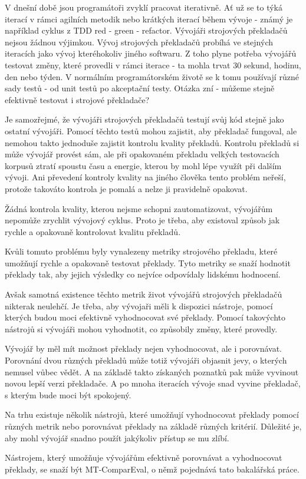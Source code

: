 V dnešní době jsou programátoři zvyklí pracovat iterativně.
Ať už se to týká iterací v rámci agilních metodik
  nebo krátkých iterací během vývoje - známý je například cyklus z TDD red - green - refactor.
Vývojáři strojových překladačů nejsou žádnou výjimkou.
Vývoj strojových překladačů probíhá ve stejných iteracích jako vývoj kteréhokoliv jiného softwaru.
Z toho plyne potřeba vývojářů testovat změny,
  které provedli v rámci iterace
  - ta mohla trvat 30 sekund, hodinu, den nebo týden.
V normálním programátorském životě se k tomu používají různé sady testů - od unit testů po akceptační testy.
Otázka zní - můžeme stejně efektivně testovat i strojové překladače?

Je samozřejmé, 
  že vývojáři strojových překladačů testují svůj kód stejně jako ostatní vývojáři.
Pomocí těchto testů mohou zajistit,
  aby překladač fungoval,
  ale nemohou takto jednoduše zajistit kontrolu kvality překladů.
Kontrolu překladů si může vývojář provést sám,
  ale při opakovaném překladu velkých testovacích korpusů ztratí spoustu času a energie,
  kterou by mohl lépe využít při dalším vývoji.
Ani převedení kontroly kvality na jiného člověka tento problém neřeší,
  protože takováto kontrola je pomalá a nelze ji pravidelně opakovat.

Žádná kontrola kvality, kterou nejsme schopni zautomatizovat,
  vývojářům nepomůže zrychlit vývojový cyklus.
Proto je třeba,
  aby existoval způsob jak rychle a opakovaně kontrolovat kvalitu překladů.

Kvůli tomuto problému byly vynalezeny metriky strojového překladu,
  které umožňují rychle a opakovaně testovat překlady.
Tyto metriky se snaží hodnotit překlady tak,
  aby jejich výsledky co nejvíce odpovídaly lidskému hodnocení.

Avšak samotná existence těchto metrik život vývojářů strojových překladačů nikterak neulehčí.
Je třeba, aby vývojaři měli k dispozici nástroje,
  pomocí kterých budou moci efektivně vyhodnocovat své překlady.
Pomocí takovýchto nástrojů si vývojáři mohou vyhodnotit,
  co způsobily změny, které provedly.

Vývojář by měl mít možnost překlady nejen vyhodnocovat,
  ale i porovnávat.
Porovnání dvou různých překladů může totiž vývojáři objasnit jevy,
  o kterých nemusel vůbec vědět.
A na základě takto získaných poznatků pak může vyvinout novou lepší verzi překladače.
A po mnoha iteracích vývoje snad vyvine překladač,
  s kterým bude moci být spokojený.

Na trhu existuje několik nástrojů,
  které umožňují vyhodnocovat překlady pomocí různých metrik
  nebo porovnávat překlady na základě různých kritérií.
Důležité je,
  aby mohl vývojář snadno použít jakýkoliv přístup se mu zlíbí.

Nástrojem,
  který umožňuje vývojářům efektivně porovnávat a vyhodnocovat překlady,
  se snaží být MT-ComparEval, 
  o němž pojednává tato bakalářská práce.
